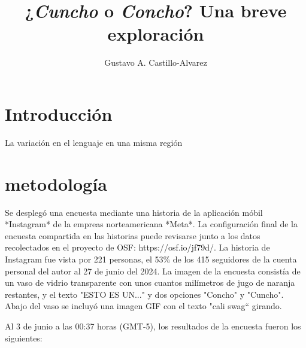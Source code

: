 \documentclass[letter, twocolumn]{article}
\title{¿\textit{Cuncho} o \textit{Concho}? Una breve exploración}
\author{Gustavo A. Castillo-Alvarez}
\begin{document}
\maketitle

\section{Introducción}
La variación en el lenguaje en una misma región 

\section{metodología}
Se desplegó una encuesta mediante una historia de la aplicación móbil *Instagram* de la empreas norteamericana *Meta*. La configuración final de la encuesta compartida en las historias puede revisarse junto a los datos recolectados en el proyecto de OSF: https://osf.io/jf79d/. La historia de Instagram fue vista por 221 personas, el 53\% de los 415 seguidores de la cuenta personal del autor al 27 de junio del 2024. La imagen de la encuesta consistía de un vaso de vidrio transparente con unos cuantos milímetros de jugo de naranja restantes, y el texto "ESTO ES UN..." y dos opciones "Concho" y "Cuncho". Abajo del vaso se incluyó una imagen GIF con el texto "cali swag`` girando. 

Al 3 de junio a las 00:37 horas (GMT-5), los resultados de la encuesta fueron los siguientes:


\end{document}
